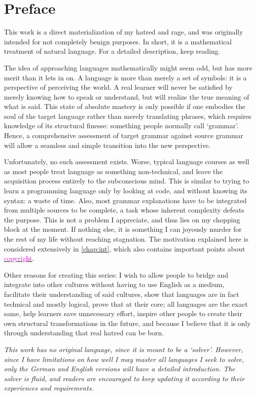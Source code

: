 \chapter*{Preface}
This work is a direct materialization of my hatred and rage, and was originally intended for not completely benign purposes. In short, it is a mathematical treatment of natural language. For a detailed description, keep reading.

The idea of approaching languages mathematically might seem odd, but has more merit than it lets in on. A language is more than merely a set of symbols: it is a perspective of perceiving the world. A real learner will never be satisfied by merely knowing how to speak or understand, but will realize the true meaning of what is said. This state of absolute mastery is only possible if one embodies the soul of the target language rather than merely translating phrases, which requires knowledge of its structural finesse: something  people normally call `grammar'. Hence, a comprehensive assessment of target grammar against source grammar will allow a seamless and simple transition into the new perspective.

Unfortunately, no such assessment exists. Worse, typical language courses as well as most people treat language as something non-technical, and leave the acquisition process entirely to the subconscious mind. This is similar to trying to learn a programming language only by looking at code, and without knowing its syntax: a waste of time. Also, most grammar explanations have to be integrated from multiple sources to be complete, a task whose inherent complexity defeats the purpose. This is not a problem I appreciate, and thus lies on my chopping block at the moment. If nothing else, it is something I can joyously murder for the rest of my life without reaching stagnation. The motivation explained here is considered extensively in \autoref{chap:int}, which also contains important points about  \hyperref[copyright]{\textcolor{magenta}{copyright}}.

Other reasons for creating this series: I wish to allow people to bridge and integrate into other cultures without having to use English as a medium,  facilitate their understanding of said cultures, show that languages are in fact technical and mostly logical, prove that at their core; all languages are the exact same, help learners save unnecessary effort,  inspire other people to create their own structural transformations in the future, and because I believe that it is only through understanding that real hatred can be born.

\textit{This work has no original language, since it is meant to be a `solver'. However, since I have limitations on how well I may master all languages I seek to solve, only the German and English versions will have a detailed introduction. The solver is fluid, and readers are encouraged to keep updating it according to their experiences and requirements.}